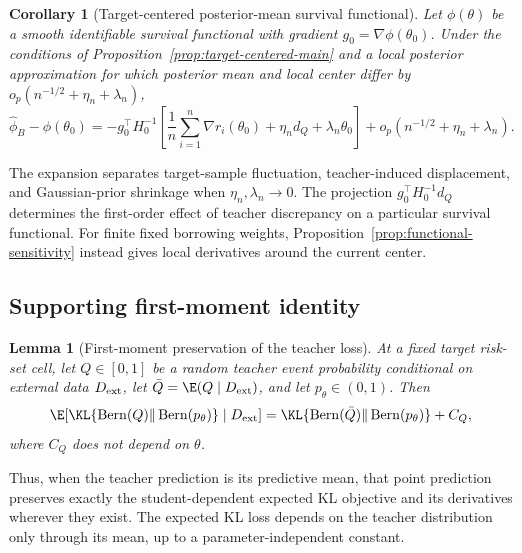 \documentclass{article} %
\newtheorem{lemma}[proposition]{Lemma}
\newtheorem{corollary}[proposition]{Corollary}
\begin{document}
\begin{corollary}[Target-centered posterior-mean survival functional]
\label{cor:posterior-mean-target-main}
Let $\phi(\theta)$ be a smooth identifiable survival functional with gradient $g_0=\nabla\phi(\theta_0)$. Under the conditions of Proposition~\ref{prop:target-centered-main} and a local posterior approximation for which posterior mean and local center differ by $o_p(n^{-1/2}+\eta_n+\lambda_n)$,
\begin{equation}
\widehat\phi_B-\phi(\theta_0)
=
-g_0^\top H_0^{-1}
\left[
\frac1n\sum_{i=1}^n\nabla r_i(\theta_0)
+
\eta_n d_Q
+
\lambda_n\theta_0
\right]
+
o_p\!\left(n^{-1/2}+\eta_n+\lambda_n\right).
\label{eq:functional-target-decomposition}
\end{equation}
\end{corollary}

The expansion separates target-sample fluctuation, teacher-induced displacement, and Gaussian-prior shrinkage when $\eta_n,\lambda_n\to0$. The projection $g_0^\top H_0^{-1}d_Q$ determines the first-order effect of teacher discrepancy on a particular survival functional. For finite fixed borrowing weights, Proposition~\ref{prop:functional-sensitivity} instead gives local derivatives around the current center.


\subsection{Supporting first-moment identity}
\begin{lemma}[First-moment preservation of the teacher loss]
\label{prop:first-moment-main}
At a fixed target risk-set cell, let $Q\in[0,1]$ be a random teacher event probability conditional on external data $D_{\rm ext}$, let $\bar Q=\E(Q\mid D_{\rm ext})$, and let $p_\theta\in(0,1)$. Then
\begin{equation}
\E\!\left[
\KL\{\operatorname{Bern}(Q)\Vert\operatorname{Bern}(p_\theta)\}
\mid D_{\rm ext}
\right]
=
\KL\{\operatorname{Bern}(\bar Q)\Vert\operatorname{Bern}(p_\theta)\}
+C_Q,
\label{eq:first-moment-main}
\end{equation}
where $C_Q$ does not depend on $\theta$.
\end{lemma}

Thus, when the teacher prediction is its predictive mean, that point prediction preserves exactly the student-dependent expected KL objective and its derivatives wherever they exist. The expected KL loss depends on the teacher distribution only through its mean, up to a parameter-independent constant.
\end{document}
